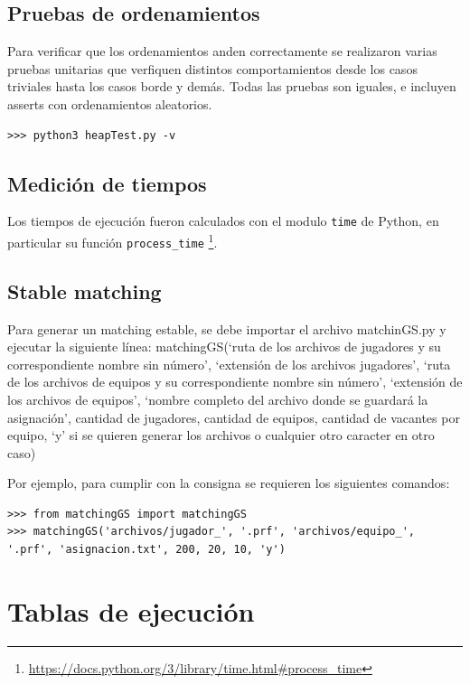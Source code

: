 \documentclass[article,a4paper]{article}
\begin{document}
\subsection{Pruebas de ordenamientos}
Para verificar que los ordenamientos anden correctamente se realizaron varias pruebas unitarias que verfiquen distintos comportamientos desde los casos triviales hasta los casos borde y demás. Todas las pruebas son iguales, e incluyen asserts con ordenamientos aleatorios.

\begin{verbatim}
>>> python3 heapTest.py -v
\end{verbatim}

\subsection{Medición de tiempos}
 Los tiempos de ejecución fueron calculados con el modulo \texttt{time} de Python, en particular su función \texttt{process\_time} \footnote{\url{https://docs.python.org/3/library/time.html\#process\_time}}.

\subsection{Stable matching}
 Para generar un matching estable, se debe importar el archivo matchinGS.py y ejecutar la siguiente línea:
matchingGS(‘ruta de los archivos  de jugadores y su correspondiente nombre sin número’, ‘extensión de los archivos jugadores’, ‘ruta de los archivos de equipos y su correspondiente nombre sin número’, ‘extensión de los archivos de equipos’, ‘nombre completo del archivo donde se guardará la asignación’, cantidad de jugadores, cantidad de equipos, cantidad de vacantes por equipo, ‘y’ si se quieren generar los archivos o cualquier otro caracter en otro caso)

Por ejemplo, para cumplir con la consigna se requieren los siguientes comandos:

\begin{verbatim}
>>> from matchingGS import matchingGS
>>> matchingGS('archivos/jugador_', '.prf', 'archivos/equipo_', '.prf', 'asignacion.txt', 200, 20, 10, 'y')
\end{verbatim}

\section{Tablas de ejecución}
\end{document}
